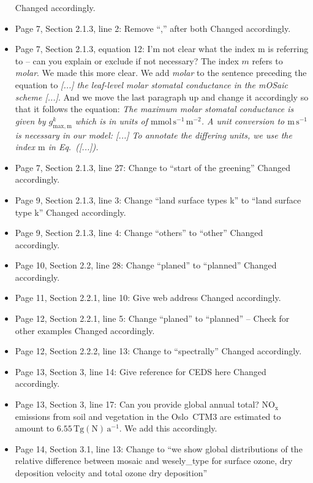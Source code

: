\begin{itemize}
  Changed accordingly.
\item {\color{blue}Page 7, Section 2.1.3, line 2: Remove “,” after both}
  Changed accordingly.
\item {\color{blue}Page 7, Section 2.1.3, equation 12: I’m not clear what the index m is referring to – can you explain or exclude if not necessary?}
  The index $m$ refers to \emph{molar}. We made this more clear. We add \emph{molar} to the sentence preceding the equation to \emph{[...] the leaf-level molar stomatal conductance in the mOSaic scheme [...]}.
  And we move the last paragraph up and change it accordingly so that it follows the equation: \emph{The maximum molar stomatal conductance is given by $g^k_\mathrm{max, m}$ which is in units of $\mathrm{mmol\,s^{-1}\,m^{-2}}$. A unit conversion to $\mathrm{m\,s^{-1}}$ is necessary in our model: [...] To annotate the differing units, we use the index $\mathrm{m}$ in Eq.~([...]).}
\item {\color{blue}Page 7, Section 2.1.3, line 27: Change to “start of the greening”}
  Changed accordingly.
\item {\color{blue}Page 9, Section 2.1.3, line 3: Change “land surface types k” to “land surface type k” }
  Changed accordingly.
\item {\color{blue}Page 9, Section 2.1.3, line 4: Change “others” to “other”}
  Changed accordingly.
\item {\color{blue}Page 10, Section 2.2, line 28: Change “planed” to “planned”}
  Changed accordingly.
\item {\color{blue}Page 11, Section 2.2.1, line 10: Give web address}
  Changed accordingly.
\item {\color{blue}Page 12, Section 2.2.1, line 5: Change “planed” to “planned” – Check for other examples}
  Changed accordingly.
\item {\color{blue}Page 12, Section 2.2.2, line 13: Change to “spectrally”}
  Changed accordingly.
\item {\color{blue}Page 13, Section 3, line 14: Give reference for CEDS here}
  Changed accordingly.
\item {\color{blue}Page 13, Section 3, line 17: Can you provide global annual total?}
  $\mathrm{NO_x}$ emissions from soil and vegetation in the Oslo~CTM3 are estimated to amount to $6.55\,\mathrm{Tg(N)\,a^{-1}}$. We add this accordingly.
\item {\color{blue}Page 14, Section 3.1, line 13: Change to “we show global distributions of the relative difference between mosaic and wesely\_type for surface ozone, dry deposition velocity and total ozone dry deposition”}

\end{itemize}
